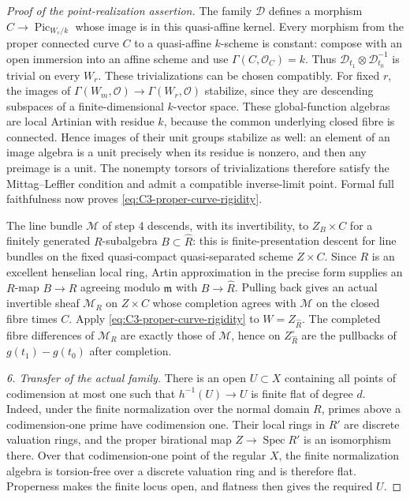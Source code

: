 \begin{proof}[Proof of the point-realization assertion]
The family $\mathcal D$ defines a morphism
$C\to\operatorname{Pic}_{W_r/k}$ whose
image is in this quasi-affine kernel.
Every morphism from the proper connected
curve $C$ to a quasi-affine $k$-scheme is
constant: compose with an open immersion
into an affine scheme and use
$\Gamma(C,\mathcal O_C)=k$.
Thus $\mathcal D_{t_1}\otimes\mathcal D_{t_0}^{-1}$
is trivial on every $W_r$.
These trivializations can be chosen compatibly.
For fixed $r$, the images of
$\Gamma(W_m,\mathcal O)\to\Gamma(W_r,\mathcal O)$
stabilize, since they are descending
subspaces of a finite-dimensional $k$-vector
space. These global-function algebras are
local Artinian with residue $k$, because
the common underlying closed fibre is
connected. Hence images of their unit
groups stabilize as well: an element of
an image algebra is a unit precisely when
its residue is nonzero, and then any
preimage is a unit. The nonempty torsors
of trivializations therefore satisfy the
Mittag--Leffler condition and admit a
compatible inverse-limit point.
Formal full faithfulness
\citep[Lemma 30.24.1, Tag 0883]{D_StacksFormalPicard}
now proves \eqref{eq:C3-proper-curve-rigidity}.

The line bundle $\mathcal M$ of step 4
descends, with its invertibility, to
$Z_B\times C$ for a finitely generated
$R$-subalgebra $B\subset\widehat R$:
this is finite-presentation descent for
line bundles on the fixed quasi-compact
quasi-separated scheme $Z\times C$.
Since $R$ is an excellent henselian local
ring, Artin approximation in the precise
form
\citet[Theorem 16.13.1, Tag 07QY]{D_StacksAlterationFamilies}
supplies an $R$-map $B\to R$ agreeing
modulo $\mathfrak m$ with $B\to\widehat R$.
Pulling back gives an actual invertible
sheaf $\mathcal M_R$ on $Z\times C$
whose completion agrees with $\mathcal M$
on the closed fibre times $C$.
Apply \eqref{eq:C3-proper-curve-rigidity}
to $W=Z_{\widehat R}$. The completed fibre
differences of $\mathcal M_R$ are exactly
those of $\mathcal M$, hence on
$Z^\circ_{\widehat R}$ are the pullbacks
of $g(t_1)-g(t_0)$ after completion.

\emph{6. Transfer of the actual family.}
There is an open $U\subset X$ containing
all points of codimension at most one
such that $h^{-1}(U)\to U$ is finite flat
of degree $d$. Indeed, under the finite
normalization over the normal domain $R$,
primes above a codimension-one prime have
codimension one. Their local rings in
$R'$ are discrete valuation rings, and
the proper birational map
$Z\to\operatorname{Spec}R'$ is an
isomorphism there. Over that codimension-one
point of the regular $X$, the finite
normalization algebra is torsion-free
over a discrete valuation ring and is
therefore flat. Properness makes
the finite locus open, and flatness then
gives the required $U$.


\end{proof}
